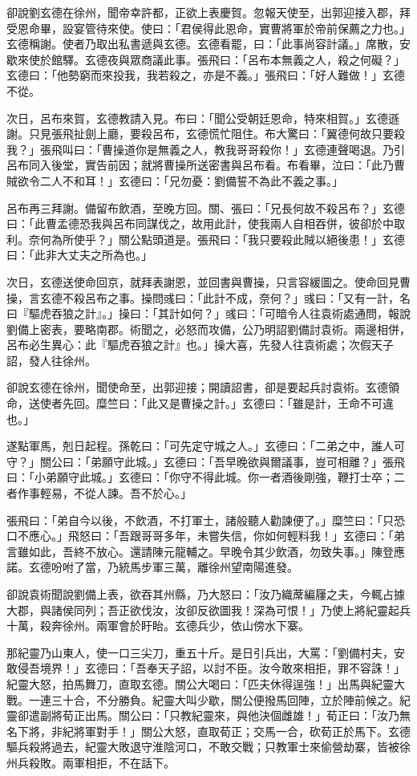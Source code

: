 卻說劉玄德在徐州，聞帝幸許都，正欲上表慶賀。忽報天使至，出郭迎接入郡，拜受恩命畢，設宴管待來使。使曰：「君侯得此恩命，實曹將軍於帝前保薦之力也。」玄德稱謝。使者乃取出私書遞與玄德。玄德看罷，曰：「此事尚容計議。」席散，安歇來使於館驛。玄德夜與眾商議此事。張飛曰：「呂布本無義之人，殺之何礙？」玄德曰：「他勢窮而來投我，我若殺之，亦是不義。」張飛曰：「好人難做！」玄德不從。

次日，呂布來賀，玄德教請入見。布曰：「聞公受朝廷恩命，特來相賀。」玄德遜謝。只見張飛扯劍上廳，要殺呂布，玄德慌忙阻住。布大驚曰：「翼德何故只要殺我？」張飛叫曰：「曹操道你是無義之人，教我哥哥殺你！」玄德連聲喝退。乃引呂布同入後堂，實告前因；就將曹操所送密書與呂布看。布看畢，泣曰：「此乃曹賊欲令二人不和耳！」玄德曰：「兄勿憂：劉備誓不為此不義之事。」

呂布再三拜謝。備留布飲酒，至晚方回。關、張曰：「兄長何故不殺呂布？」玄德曰：「此曹孟德恐我與呂布同謀伐之，故用此計，使我兩人自相吞併，彼卻於中取利。奈何為所使乎？」關公點頭道是。張飛曰：「我只要殺此賊以絕後患！」玄德曰：「此非大丈夫之所為也。」

次日，玄德送使命回京，就拜表謝恩，並回書與曹操，只言容緩圖之。使命回見曹操，言玄德不殺呂布之事。操問彧曰：「此計不成，奈何？」彧曰：「又有一計，名曰『驅虎吞狼之計』。」操曰：「其計如何？」彧曰：「可暗令人往袁術處通問，報說劉備上密表，要略南郡。術聞之，必怒而攻備，公乃明詔劉備討袁術。兩邊相併，呂布必生異心：此『驅虎吞狼之計』也。」操大喜，先發人往袁術處；次假天子詔，發人往徐州。

卻說玄德在徐州，聞使命至，出郭迎接；開讀詔書，卻是要起兵討袁術。玄德領命，送使者先回。糜竺曰：「此又是曹操之計。」玄德曰：「雖是計，王命不可違也。」

遂點軍馬，剋日起程。孫乾曰：「可先定守城之人。」玄德曰：「二弟之中，誰人可守？」關公曰：「弟願守此城。」玄德曰：「吾早晚欲與爾議事，豈可相離？」張飛曰：「小弟願守此城。」玄德曰：「你守不得此城。你一者酒後剛強，鞭打士卒；二者作事輕易，不從人諫。吾不於心。」

張飛曰：「弟自今以後，不飲酒，不打軍士，諸般聽人勸諫便了。」糜竺曰：「只恐口不應心。」飛怒曰：「吾跟哥哥多年，未嘗失信，你如何輕料我！」玄德曰：「弟言雖如此，吾終不放心。還請陳元龍輔之。早晚令其少飲酒，勿致失事。」陳登應諾。玄德吩咐了當，乃統馬步軍三萬，離徐州望南陽進發。

卻說袁術聞說劉備上表，欲吞其州縣，乃大怒曰：「汝乃織蓆編屨之夫，今輒占據大郡，與諸侯同列；吾正欲伐汝，汝卻反欲圖我！深為可恨！」乃使上將紀靈起兵十萬，殺奔徐州。兩軍會於盱眙。玄德兵少，依山傍水下寨。

那紀靈乃山東人，使一口三尖刀，重五十斤。是日引兵出，大罵：「劉備村夫，安敢侵吾境界！」玄德曰：「吾奉天子詔，以討不臣。汝今敢來相拒，罪不容誅！」紀靈大怒，拍馬舞刀，直取玄德。關公大喝曰：「匹夫休得逞強！」出馬與紀靈大戰。一連三十合，不分勝負。紀靈大叫少歇，關公便撥馬回陣，立於陣前候之。紀靈卻遣副將荀正出馬。關公曰：「只教紀靈來，與他決個雌雄！」荀正曰：「汝乃無名下將，非紀將軍對手！」關公大怒，直取荀正；交馬一合，砍荀正於馬下。玄德驅兵殺將過去，紀靈大敗退守淮陰河口，不敢交戰；只教軍士來偷營劫寨，皆被徐州兵殺敗。兩軍相拒，不在話下。

